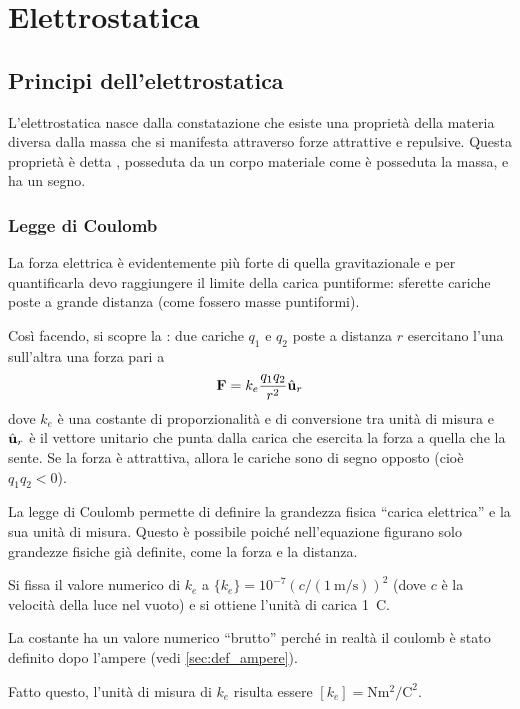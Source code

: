 \chapter{Elettrostatica}

\section{Principi dell'elettrostatica}

L'elettrostatica nasce dalla constatazione che esiste una proprietà della materia diversa dalla massa che si manifesta attraverso forze attrattive e repulsive.
Questa proprietà è detta , posseduta da un corpo materiale come è posseduta la massa, e ha un segno.

\subsection{Legge di Coulomb}

La forza elettrica è evidentemente più forte di quella gravitazionale e per quantificarla devo raggiungere il limite della carica puntiforme: sferette cariche poste a grande distanza (come fossero masse puntiformi).

Così facendo, si scopre la : due cariche $q_1$ e $q_2$ poste a distanza $r$ esercitano l'una sull'altra una forza pari a
\begin{equation}
    \mathbf{F} = k_e \frac{q_1 q_2}{r^2} \hat{\mathbf{u}}_{r}
\end{equation}
dove $k_e$ è una costante di proporzionalità e di conversione tra unità di misura e $\hat{\mathbf{u}}_{r}$ è il vettore unitario che punta dalla carica che esercita la forza a quella che la sente.
Se la forza è attrattiva, allora le cariche sono di segno opposto (cioè $q_1 q_2 < 0$).

La legge di Coulomb permette di definire la grandezza fisica ``carica elettrica'' e la sua unità di misura.
Questo è possibile poiché nell'equazione figurano solo grandezze fisiche già definite, come la forza e la distanza.

Si fissa il valore numerico di $k_e$ a $\{k_e\} = 10^{-7} (c / (\qty{1}{\metre\per\second}))^2$ (dove $c$ è la velocità della luce nel vuoto) e si ottiene l'unità di carica \qty{1}{\coulomb}.

La costante ha un valore numerico ``brutto'' perché in realtà il coulomb è stato definito dopo l'ampere (vedi \autoref{sec:def_ampere}).

Fatto questo, l'unità di misura di $k_e$ risulta essere $[k_e] = \unit{\newton\metre\squared\per\coulomb\squared}$.

